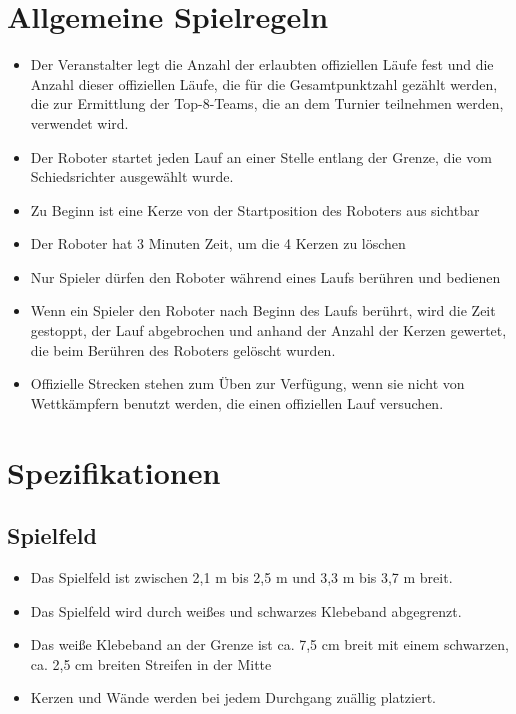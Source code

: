 \documentclass[a4paper,12pt]{article}
\begin{document}
\section{Allgemeine Spielregeln}
\begin{itemize}
	\item Der Veranstalter legt die Anzahl der erlaubten offiziellen Läufe
		fest und die Anzahl dieser offiziellen Läufe, die für die
		Gesamtpunktzahl gezählt werden, die zur Ermittlung der
		Top-8-Teams, die an dem Turnier teilnehmen werden, verwendet
		wird.
	\item Der Roboter startet jeden Lauf an einer Stelle entlang der
		Grenze, die vom Schiedsrichter ausgewählt wurde.
	\item Zu Beginn ist eine Kerze von der Startposition des Roboters aus
		sichtbar
	\item Der Roboter hat 3 Minuten Zeit, um die 4 Kerzen zu löschen
	\item Nur Spieler dürfen den Roboter während eines Laufs berühren und
		bedienen
	\item Wenn ein Spieler den Roboter nach Beginn des Laufs berührt, wird
		die Zeit gestoppt, der Lauf abgebrochen und anhand der  Anzahl
		der Kerzen gewertet, die beim Berühren des Roboters gelöscht
		wurden.
	\item Offizielle Strecken stehen zum Üben zur Verfügung, wenn sie nicht
		von Wettkämpfern benutzt werden, die einen offiziellen Lauf
		versuchen.
\end{itemize}

\section{Spezifikationen}

\subsection{Spielfeld}
\begin{itemize}
	\item Das Spielfeld ist zwischen 2,1 m bis 2,5 m und 3,3 m bis 3,7 m
		breit.
	\item Das Spielfeld wird durch weißes und schwarzes Klebeband
		abgegrenzt.
	\item Das weiße Klebeband an der Grenze ist ca. 7,5 cm breit mit einem
		schwarzen, ca. 2,5 cm breiten Streifen in der Mitte
	\item Kerzen und Wände werden bei jedem Durchgang zuällig platziert.
\end{itemize}
\end{document}
